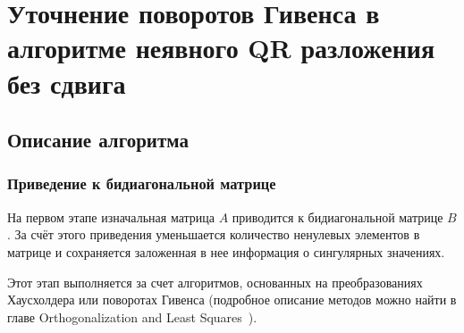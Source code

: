 

\section{Уточнение поворотов Гивенса в алгоритме неявного QR разложения без сдвига}

\subsection{Описание алгоритма}

\subsubsection{Приведение к бидиагональной матрице}

На первом этапе изначальная матрица $A$ приводится к бидиагональной матрице $B$. За счёт этого приведения уменьшается количество ненулевых элементов в матрице и сохраняется заложенная в нее информация о сингулярных значениях. 

Этот этап выполняется за счет алгоритмов, основанных на преобразованиях Хаусхолдера или поворотах Гивенса (подробное описание методов можно найти в главе Orthogonalization and Least Squares~\cite{Golub2013}). 

